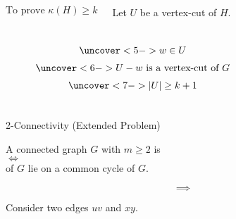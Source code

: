 \begin{frame}{}
  \begin{columns}
      \[
	\text{To prove } \kappa(H) \ge k
      \]

      \pause
      \begin{center}
	Let $U$ be a vertex-cut of $H$. \\[5pt]
      \end{center}
  \end{columns}

  \pause
  \vspace{0.50cm}
  \begin{columns}[t]
      \begin{center}
      \end{center}

      \begin{center}
      \end{center}

      \vspace{-0.60cm}
      \begin{gather*}
	\uncover<5->{ w \in U } \\[3pt]
	\uncover<6->{ U - w \text{ is a vertex-cut of } G } \\[3pt]
	\uncover<7->{ |U| \ge k + 1 }
      \end{gather*}
  \end{columns}
\end{frame}

\begin{frame}{}
  \begin{exampleblock}{2-Connectivity (Extended Problem)}
    \begin{center}
      A connected graph $G$ with $m \ge 2$ is  \\[3pt]
      $\iff$ \\[3pt]
       of $G$ lie on a common cycle of $G$.
    \end{center}
  \end{exampleblock}

  \pause
  \[
    \implies
  \]
  \begin{center}
    Consider two edges $uv$ and $xy$.
  \end{center}

  \pause
  \begin{columns}
  \end{columns}
\end{frame}
